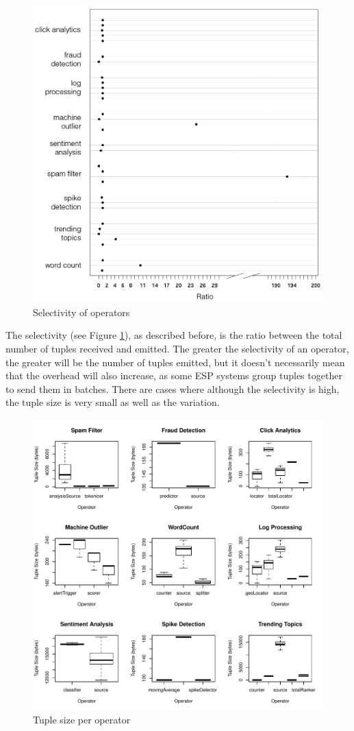 \documentclass[ppgc,diss,english]{iiufrgs}
\begin{document}
\begin{figure}[ht!]
    \centering
	\includegraphics[width=.8\textwidth]{images/selectivity.png}
	\caption{Selectivity of operators}
	\label{fig:operator_selectivity}
\end{figure}

The selectivity (see Figure \ref{fig:operator_selectivity}), as described before, is the ratio between the total number of tuples received and emitted. The greater the selectivity of an operator, the greater will be the number of tuples emitted, but it doesn't necessarily mean that the overhead will also increase, as some ESP systems group tuples together to send them in batches. There are cases where although the selectivity is high, the tuple size is very small as well as the variation.

\begin{figure}[ht!]
    \centering
	\includegraphics[width=.8\textwidth]{images/tuple_size.pdf}
	\caption{Tuple size per operator}
	\label{fig:tuple_size}
\end{figure}
\end{document}
